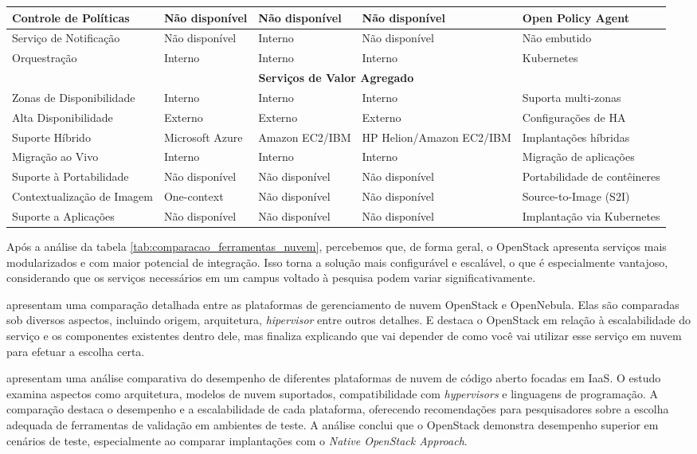 \begin{longtable}{|p{3cm}|p{2.8cm}|p{2.8cm}|p{2.8cm}|p{2.8cm}|}
\hline
Controle de Políticas & Não disponível & Não disponível & Não disponível & Open Policy Agent \\
\hline
Serviço de Notificação & Não disponível & Interno & Não disponível & Não embutido \\
\hline
Orquestração & Interno & Interno & Interno & Kubernetes \\
\hline
\multicolumn{5}{|c|}{\textbf{Serviços de Valor Agregado}} \\
\hline
Zonas de Disponibilidade & Interno & Interno & Interno & Suporta multi-zonas \\
\hline
Alta Disponibilidade & Externo & Externo & Externo & Configurações de HA \\
\hline
Suporte Híbrido & Microsoft Azure & Amazon EC2/IBM & HP Helion/Amazon EC2/IBM & Implantações híbridas \\
\hline
Migração ao Vivo & Interno & Interno & Interno & Migração de aplicações \\
\hline
Suporte à Portabilidade & Não disponível & Não disponível & Não disponível & Portabilidade de contêineres \\
\hline
Contextualização de Imagem & One-context & Não disponível & Não disponível & Source-to-Image (S2I) \\
\hline
Suporte a Aplicações & Não disponível & Não disponível & Não disponível & Implantação via Kubernetes \\
\hline
\end{longtable}

\normalsize %

Após a análise da tabela \ref{tab:comparacao_ferramentas_nuvem}, percebemos que, de forma geral, o OpenStack apresenta serviços mais modularizados e com maior potencial de integração. Isso torna a solução mais configurável e escalável, o que é especialmente vantajoso, considerando que os serviços necessários em um campus voltado à pesquisa podem variar significativamente. 

\cite{wen2012comparison} apresentam uma comparação detalhada entre as plataformas de gerenciamento de nuvem OpenStack e OpenNebula. Elas são comparadas sob diversos aspectos, incluindo origem, arquitetura, \textit{hipervisor} entre outros detalhes. E destaca o OpenStack em relação à escalabilidade do serviço e os componentes existentes dentro dele, mas finaliza explicando que vai depender de como você vai utilizar esse serviço em nuvem para efetuar a escolha certa.

\cite{shahzadi2017infrastructure} apresentam uma análise comparativa do desempenho de diferentes plataformas de nuvem de código aberto focadas em IaaS. O estudo examina aspectos como arquitetura, modelos de nuvem suportados, compatibilidade com \textit{hypervisors} e linguagens de programação. A comparação destaca o desempenho e a escalabilidade de cada plataforma, oferecendo recomendações para pesquisadores sobre a escolha adequada de ferramentas de validação em ambientes de teste. A análise conclui que o OpenStack demonstra desempenho superior em cenários de teste, especialmente ao comparar implantações com o \textit{Native OpenStack Approach}.

